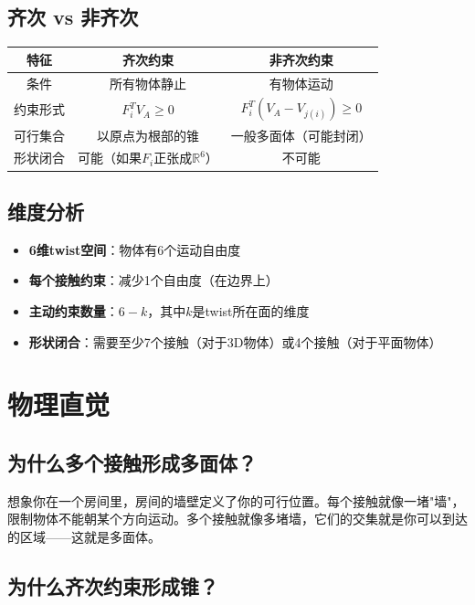 \documentclass[12pt,a4paper]{article}
\begin{document}
\subsection{齐次 vs 非齐次}

\begin{center}
\begin{tabular}{|c|c|c|}
\hline
\textbf{特征} & \textbf{齐次约束} & \textbf{非齐次约束} \\
\hline
条件 & 所有物体静止 & 有物体运动 \\
\hline
约束形式 & $F_i^T V_A \geq 0$ & $F_i^T (V_A - V_{j(i)}) \geq 0$ \\
\hline
可行集合 & 以原点为根部的锥 & 一般多面体（可能封闭） \\
\hline
形状闭合 & 可能（如果$F_i$正张成$\mathbb{R}^6$） & 不可能 \\
\hline
\end{tabular}
\end{center}

\subsection{维度分析}

\begin{itemize}
\item \textbf{6维twist空间}：物体有6个运动自由度
\item \textbf{每个接触约束}：减少1个自由度（在边界上）
\item \textbf{主动约束数量}：$6 - k$，其中$k$是twist所在面的维度
\item \textbf{形状闭合}：需要至少7个接触（对于3D物体）或4个接触（对于平面物体）
\end{itemize}

\section{物理直觉}

\subsection{为什么多个接触形成多面体？}

想象你在一个房间里，房间的墙壁定义了你的可行位置。每个接触就像一堵"墙"，限制物体不能朝某个方向运动。多个接触就像多堵墙，它们的交集就是你可以到达的区域——这就是多面体。

\subsection{为什么齐次约束形成锥？}
\end{document}
